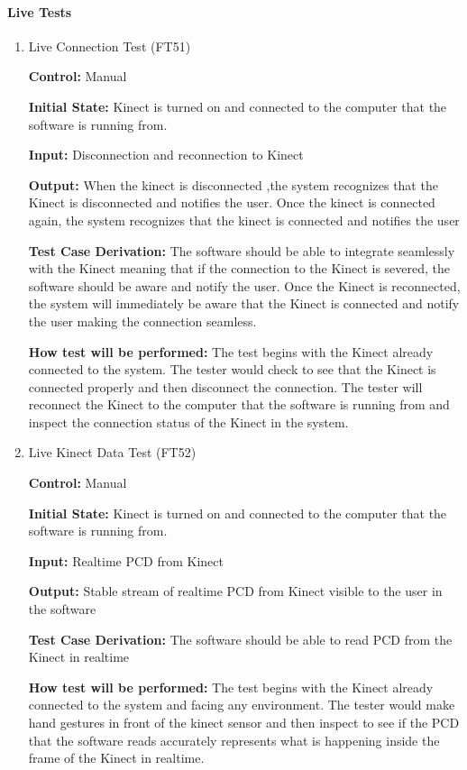 \documentclass[12pt, titlepage]{article}
\begin{document}
\paragraph{Live Tests}
\begin{enumerate}
\item{Live Connection Test (FT51)\label{FT51}}
  
\textbf{Control:} Manual

\textbf{Initial State:} Kinect is turned on and connected to the computer that the software is running from. 

\textbf{Input:} Disconnection and reconnection to Kinect

\textbf{Output:} When the kinect is disconnected ,the system recognizes that the Kinect is disconnected and notifies the user. Once the kinect is connected again, the system recognizes that the kinect is connected and notifies the user

\textbf{Test Case Derivation:} The software should be able to integrate seamlessly with the Kinect meaning that if the connection to the Kinect is severed, the software should be aware and notify the user. Once the Kinect is reconnected, the system will immediately be aware that the Kinect is connected and notify the user making the connection seamless.

\textbf{How test will be performed:} The test begins with the Kinect already connected to the system. The tester would check to see that the Kinect is connected properly and then disconnect the connection. The tester will reconnect the Kinect to the computer that the software is running from and inspect the connection status of the Kinect in the system.

\item{Live Kinect Data Test (FT52)\label{FT52}}

\textbf{Control:} Manual

\textbf{Initial State:} Kinect is turned on and connected to the computer that the software is running from. 

\textbf{Input:} Realtime PCD from Kinect

\textbf{Output:} Stable stream of realtime PCD from Kinect visible to the user in the software

\textbf{Test Case Derivation:} The software should be able to read PCD from the Kinect in realtime

\textbf{How test will be performed:} The test begins with the Kinect already connected to the system and facing any environment. The tester would make hand gestures in front of the kinect sensor and then inspect to see if the PCD that the software reads accurately represents what is happening inside the frame of the Kinect in realtime.

\end{enumerate} 
\end{document}
